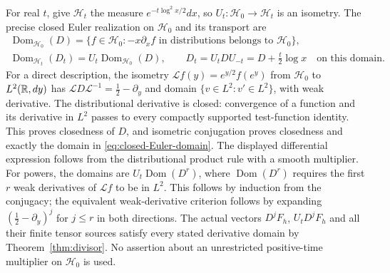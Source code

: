 \documentclass[11pt]{article}
\begin{document}
For real $t$, give $\mathcal H_t$ the measure
$e^{-t\log^2x/2}dx$, so $U_t:\mathcal H_0\to\mathcal H_t$ is an isometry.
The precise closed Euler realization on $\mathcal H_0$ and its transport are
\begin{equation}\label{eq:closed-Euler-domain}
\begin{gathered}
\operatorname{Dom}_{\mathcal H_0}(D)=
\{f\in\mathcal H_0:-x\partial_xf\text{ in distributions belongs to }\mathcal H_0\},\\
\operatorname{Dom}_{\mathcal H_t}(D_t)=U_t\operatorname{Dom}_{\mathcal H_0}(D),
\qquad D_t=U_tDU_{-t}=D+\tfrac t2\log x
\quad\text{on this domain}.
\end{gathered}
\end{equation}
For a direct description, the isometry
$\mathcal Lf(y)=e^{y/2}f(e^y)$ from $\mathcal H_0$ to $L^2(\mathbb R,dy)$
has $\mathcal L D\mathcal L^{-1}=\tfrac12-\partial_y$ and
domain $\{v\in L^2:v'\in L^2\}$, with weak derivative.
The distributional derivative is closed: convergence of a function
and its derivative in $L^2$ passes to every compactly supported
test-function identity. This proves closedness of $D$, and isometric
conjugation proves closedness and exactly the domain in
\eqref{eq:closed-Euler-domain}. The displayed differential expression
follows from the distributional product rule with a smooth multiplier.
For powers, the domains are $U_t\operatorname{Dom}(D^r)$, where
$\operatorname{Dom}(D^r)$ requires the first $r$ weak derivatives of
$\mathcal Lf$ to be in $L^2$. This follows by induction from the
conjugacy; the equivalent weak-derivative criterion follows by
expanding $(\tfrac12-\partial_y)^j$ for $j\leq r$ in both
directions. The actual vectors $D^jF_h$, $U_tD^jF_h$ and all their
finite tensor sources satisfy every stated derivative domain by
Theorem~\ref{thm:divisor}. No assertion about an unrestricted
positive-time multiplier on $\mathcal H_0$ is used.
\end{document}
